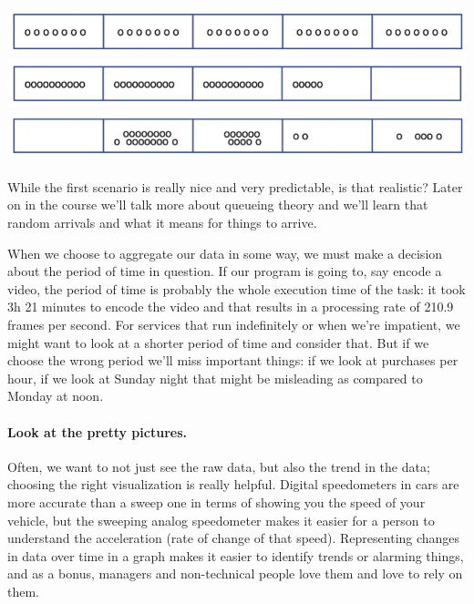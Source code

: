 \begin{center}
	\includegraphics{images/burst1}\\
	\includegraphics{images/burst2}\\
	\includegraphics{images/burst3}\\
\end{center}

While the first scenario is really nice and very predictable, is that realistic? Later on in the course we'll talk more about queueing theory and we'll learn that random arrivals and what it means for things to arrive.

When we choose to aggregate our data in some way, we must make a decision about the period of time in question. If our program is going to, say encode a video, the period of time is probably the whole execution time of the task: it took 3h 21 minutes to encode the video and that results in a processing rate of 210.9 frames per second. For services that run indefinitely or when we're impatient, we might want to look at a shorter period of time and consider that. But if we choose the wrong period we'll miss important things: if we look at purchases per hour, if we look at Sunday night that might be misleading as compared to Monday at noon.

\paragraph{Look at the pretty pictures.} 
Often, we want to not just see the raw data, but also the trend in the data; choosing the right visualization is really helpful. Digital speedometers in cars are more accurate than a sweep one in terms of showing you the speed of your vehicle, but the sweeping analog speedometer makes it easier for a person to understand the acceleration (rate of change of that speed). Representing changes in data over time in a graph makes it easier to identify trends or alarming things, and as a bonus, managers and non-technical people love them and love to rely on them. 

